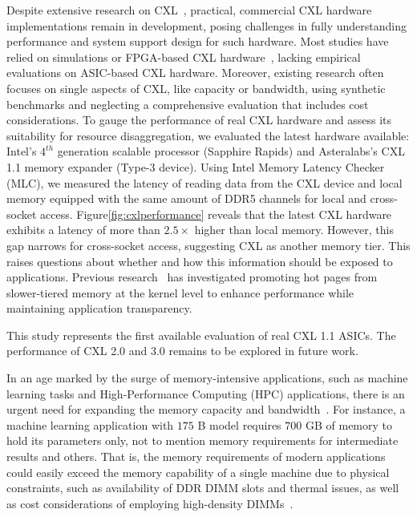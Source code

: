 Despite extensive research on CXL~\cite{cxl_azure,cxlcentric,demystify}, practical, commercial CXL hardware implementations remain in development, posing challenges in fully understanding performance and system support design for such hardware. Most studies have relied on simulations or FPGA-based CXL hardware~\cite{demystify,intelfpga}, lacking empirical evaluations on ASIC-based CXL hardware. Moreover, existing research often focuses on single aspects of CXL, like capacity or bandwidth, using synthetic benchmarks and neglecting a comprehensive evaluation that includes cost considerations. To gauge the performance of real CXL hardware and assess its suitability for resource disaggregation, we evaluated the latest hardware available: Intel's $\text{4}^{th}$ generation scalable processor (Sapphire Rapids) and Asteralabs's CXL 1.1 memory expander (Type-3 device). Using Intel Memory Latency Checker (MLC)\cite{mlc}, we measured the latency of reading data from the CXL device and local memory equipped with the same amount of DDR5 channels for local and cross-socket access. Figure\ref{fig:cxlperformance} reveals that the latest CXL hardware exhibits a latency of more than $2.5\times$ higher than local memory. However, this gap narrows for cross-socket access, suggesting CXL as another memory tier. This raises questions about whether and how this information should be exposed to applications. Previous research~\cite{tpp} has investigated promoting hot pages from slower-tiered memory at the kernel level to enhance performance while maintaining application transparency.

This study represents the first available evaluation of real CXL 1.1 ASICs. The performance of CXL 2.0 and 3.0 remains to be explored in future work.


In an age marked by the surge of memory-intensive applications, such as machine learning tasks and High-Performance Computing (HPC) applications, there is an urgent need for expanding the memory capacity and bandwidth~\cite{dataintensive, FlatFlash, cxl-ssd}. 
For instance, a machine learning application with $175$ B model requires $700$ GB of memory to hold its parameters only, not to mention memory requirements for intermediate results and others. That is, the memory requirements of modern applications could easily exceed the memory capability of a single machine due to physical constraints, such as availability of DDR DIMM slots and thermal issues, as well as cost considerations of employing high-density DIMMs~\cite{FlatFlash, cxl-ssd}.

